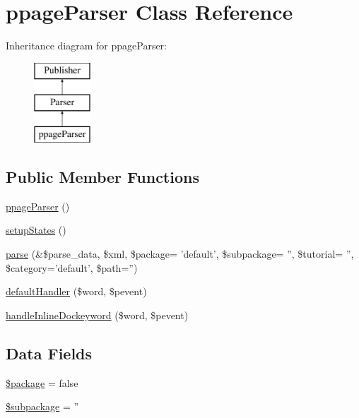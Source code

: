 \hypertarget{classppage_parser}{\section{ppage\-Parser \-Class \-Reference}
\label{classppage_parser}
}
\-Inheritance diagram for ppage\-Parser\-:\begin{figure}[H]
\begin{center}
\leavevmode
\includegraphics[height=3.000000cm]{classppage_parser}
\end{center}
\end{figure}
\subsection*{\-Public \-Member \-Functions}
\begin{DoxyCompactItemize}
\item 
\hyperlink{classppage_parser_adc2413a5388f2e9d70c8a8007a58f0fa}{ppage\-Parser} ()
\item 
\hyperlink{classppage_parser_abe4d21ebe5f9d4088e7be4271603cd5e}{setup\-States} ()
\item 
\hyperlink{classppage_parser_ad973622c9582c6601c25cfac6157b1e0}{parse} (\&\$parse\-\_\-data, \$xml, \$package= 'default', \$subpackage= '', \$tutorial= '', \$category='default', \$path='')
\item 
\hyperlink{classppage_parser_a4d5d6de1bd28d678fdca6e4d5e0076b0}{default\-Handler} (\$word, \$pevent)
\item 
\hyperlink{classppage_parser_ae3644280a89428ea2a91213fb83d9027}{handle\-Inline\-Dockeyword} (\$word, \$pevent)
\end{DoxyCompactItemize}
\subsection*{\-Data \-Fields}
\begin{DoxyCompactItemize}
\item 
\hyperlink{classppage_parser_a365395516cc195292e97e09bc0d165ae}{\$package} = false
\item 
\hyperlink{classppage_parser_ac601dc8dc2a086b6381128cc9c7a3fc5}{\$subpackage} = ''
\end{DoxyCompactItemize}


